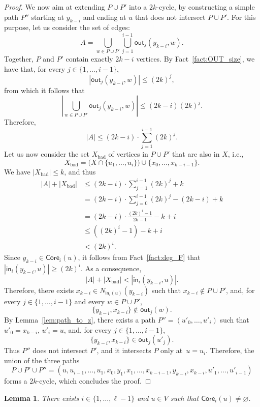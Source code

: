 \documentclass{article}
\newcommand{\F}{{\mathsf{out}}}
\renewcommand{\H}{{\mathsf{in}}}
\newcommand{\bp}{X}
\newtheorem{lemma}{Lemma}
\begin{document}
\begin{proof}
We now aim at extending $P\cup P'$ into a $2k$-cycle, by constructing a simple path $P''$ starting at $y_{k-i}$ and ending at $u$ that does not intersect $P\cup P'$. For this purpose, let us consider the set of edges: 
\[
A=\bigcup_{w\in P\cup P'}\bigcup_{j=1}^{i-1} \F_j(y_{k-i},w).
\]
Together, $P$ and  $P'$ contain exactly $2k-i$ vertices. By Fact~\ref{fact:OUT_size}, we have that, for every $j\in\{1,\dots,i-1\}$, \[|\F_j(y_{k-i},w)| \leq (2k)^j,\] 
from which it follows that
\[
|\bigcup_{w\in P\cup P'}\F_j(y_{k-i},w)|\leq (2k-i)(2k)^j.
\]
Therefore, 
\[|A| \leq (2k-i)\cdot \sum_{j=1}^{i-1}(2k)^j.\]
Let us now consider  the set $\bp_{\text{bad}}$ of vertices in $P\cup P'$ that are also in $\bp$, i.e., 
\[
\bp_{\text{bad}}= \bigl(\bp\cap\{u_1,\dots,u_i\}\bigr)\cup\{x_0,\dots,x_{k-i-1}\}.
\]
We have $|\bp_{\text{bad}}| \leq k$, and thus
\begin{align*}
|A|+|\bp_{\text{bad}}|
& \leq (2k-i) \cdot \sum_{j=1}^{i-1}(2k)^j + k \\
& = (2k-i) \cdot \sum_{j=0}^{i-1}(2k)^j - (2k-i) + k \\
& = (2k-i) \cdot \frac{(2k)^i-1}{2k-1} - k+i \\
& \leq ((2k)^i-1) -k +i \\
& < (2k)^i.
\end{align*}
Since $y_{k-i}\in \mathsf{Core}_i(u)$, it follows from Fact~\ref{fact:deg_F} that $|\H_i(y_{k-i},u)|\geq (2k)^i$. As a consequence, 
\[|A|+|\bp_{\text{bad}}|<|\H_i(y_{k-i},u)|.\]
Therefore, there exists $x_{k-i}\in N_{\H_i(u)}(y_{k-i})$ such that $x_{k-i}\notin P\cup P'$, and, for every $j\in\{1,\dots,i-1\}$ and every $w\in P\cup P'$,
\[\{y_{k-i},x_{k-i}\}\notin \F_j(w).\]
By Lemma~\ref{lem:path_to_z}, there exists a path $P''=(u'_0,\dots,u'_i)$ such that $u'_0=x_{k-i}$, $u'_i=u$, and, for every $j\in\{1,\dots,i-1\}$, 
\[\{y_{k-i},x_{k-i}\}\in\F_j(u'_j).\] 
Thus $P''$ does not intersect $P'$, and it  intersects $P$ only at~$u=u_i$. Therefore, the union of the three paths 
\[
P\cup P'\cup P''= (u,u_{i-1},\dots,u_1,x_0,y_1,x_1,\dots,x_{k-i-1},y_{k-i},x_{k-i},u'_1,\dots,u'_{i-1})\]
forms a $2k$-cycle, which concludes the proof. 
\end{proof}


\begin{lemma}\label{lem:ker}
    There exists $i\in\{1,\dots,\ell-1\}$ and $u \in V$ such that $\mathsf{Core}_i(u)\neq\varnothing$.
\end{lemma}
\end{document}
